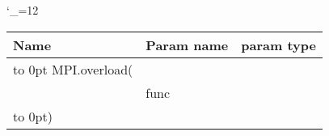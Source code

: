 \begingroup \catcode`\_=12 \tt
\begin{tabular}{lll}
\toprule
\textrm{Name}&\textrm{Param name}&\textrm{param type}\\
\midrule
\hbox to 0pt {MPI.overload(\hss}\\
& func\\
\hbox to 0pt{)\hss}\\
\bottomrule
\end{tabular}
\endgroup
